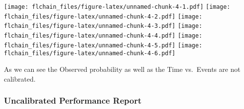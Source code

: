 \documentclass[
]{article}
\newenvironment{Shaded}{\begin{snugshade}}{\end{snugshade}}
\newcommand{\AttributeTok}[1]{\textcolor[rgb]{0.13,0.29,0.53}{#1}}
\newcommand{\FloatTok}[1]{\textcolor[rgb]{0.00,0.00,0.81}{#1}}
\newcommand{\FunctionTok}[1]{\textcolor[rgb]{0.13,0.29,0.53}{\textbf{#1}}}
\newcommand{\NormalTok}[1]{#1}
\newcommand{\OtherTok}[1]{\textcolor[rgb]{0.56,0.35,0.01}{#1}}
\newcommand{\SpecialCharTok}[1]{\textcolor[rgb]{0.81,0.36,0.00}{\textbf{#1}}}
\newcommand{\StringTok}[1]{\textcolor[rgb]{0.31,0.60,0.02}{#1}}
\begin{document}
\begin{Shaded}
\end{Shaded}

\texttt{[image: flchain\_files/figure-latex/unnamed-chunk-4-1.pdf]}
\texttt{[image: flchain\_files/figure-latex/unnamed-chunk-4-2.pdf]}
\texttt{[image: flchain\_files/figure-latex/unnamed-chunk-4-3.pdf]}
\texttt{[image: flchain\_files/figure-latex/unnamed-chunk-4-4.pdf]}
\texttt{[image: flchain\_files/figure-latex/unnamed-chunk-4-5.pdf]}
\texttt{[image: flchain\_files/figure-latex/unnamed-chunk-4-6.pdf]}

As we can see the Observed probability as well as the Time vs.~Events
are not calibrated.

\hypertarget{uncalibrated-performance-report}{%
\subsubsection{Uncalibrated Performance
Report}\label{uncalibrated-performance-report}}

\begin{Shaded}
\end{Shaded}
\end{document}
